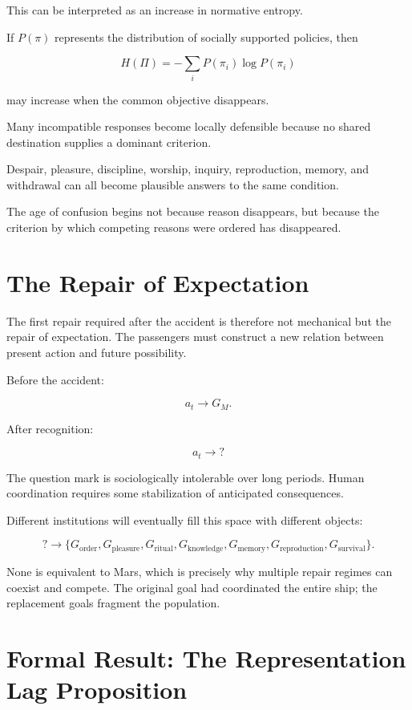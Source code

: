 \documentclass[11pt,oneside]{book}
\theoremstyle{definition}
\theoremstyle{remark}
\begin{document}
This can be interpreted as an increase in normative entropy.

If \(P(\pi)\) represents the distribution of socially supported policies, then

\[
H(\Pi)
=
-\sum_iP(\pi_i)\log P(\pi_i)
\]

may increase when the common objective disappears.

Many incompatible responses become locally defensible because no shared destination supplies a dominant criterion.

Despair, pleasure, discipline, worship, inquiry, reproduction, memory, and withdrawal can all become plausible answers to the same condition.

The age of confusion begins not because reason disappears, but because the criterion by which competing reasons were ordered has disappeared.

\section{The Repair of Expectation}

The first repair required after the accident is therefore not mechanical but the repair of expectation. The passengers must construct a new relation between present action and future possibility.

Before the accident:

\[
a_t
\rightarrow
G_M.
\]

After recognition:

\[
a_t
\rightarrow
?
\]

The question mark is sociologically intolerable over long periods. Human coordination requires some stabilization of anticipated consequences.

Different institutions will eventually fill this space with different objects:

\[
?
\rightarrow
\{
G_{\mathrm{order}},
G_{\mathrm{pleasure}},
G_{\mathrm{ritual}},
G_{\mathrm{knowledge}},
G_{\mathrm{memory}},
G_{\mathrm{reproduction}},
G_{\mathrm{survival}}
\}.
\]

None is equivalent to Mars, which is precisely why multiple repair regimes can coexist and compete. The original goal had coordinated the entire ship; the replacement goals fragment the population.

\section{Formal Result: The Representation Lag Proposition}
\end{document}
